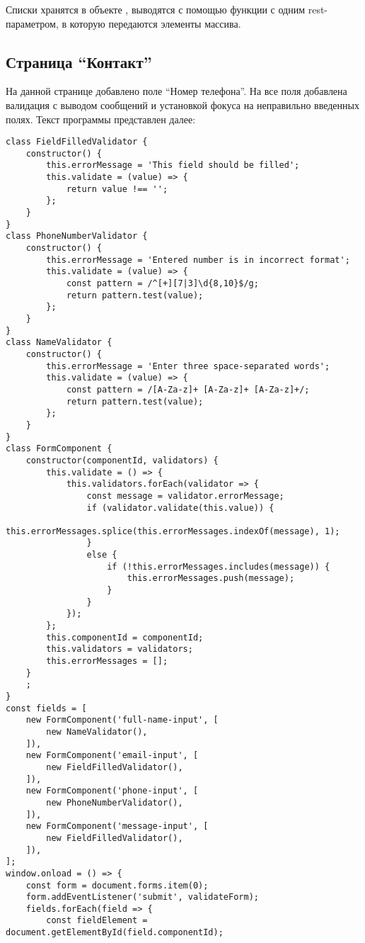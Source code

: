 \documentclass[a4paper,14pt]{extarticle}
\begin{document}
Списки хранятся в объекте , выводятся с помощью
функции с одним rest-параметром, в которую передаются элементы массива.

\subsection{Страница \enquote{Контакт}}
На данной странице добавлено поле \enquote{Номер телефона}. На все поля
добавлена валидация с выводом сообщений и установкой фокуса на
неправильно введенных полях. Текст программы представлен далее:
\begin{lstlisting}
class FieldFilledValidator {
    constructor() {
        this.errorMessage = 'This field should be filled';
        this.validate = (value) => {
            return value !== '';
        };
    }
}
class PhoneNumberValidator {
    constructor() {
        this.errorMessage = 'Entered number is in incorrect format';
        this.validate = (value) => {
            const pattern = /^[+][7|3]\d{8,10}$/g;
            return pattern.test(value);
        };
    }
}
class NameValidator {
    constructor() {
        this.errorMessage = 'Enter three space-separated words';
        this.validate = (value) => {
            const pattern = /[A-Za-z]+ [A-Za-z]+ [A-Za-z]+/;
            return pattern.test(value);
        };
    }
}
class FormComponent {
    constructor(componentId, validators) {
        this.validate = () => {
            this.validators.forEach(validator => {
                const message = validator.errorMessage;
                if (validator.validate(this.value)) {
                    this.errorMessages.splice(this.errorMessages.indexOf(message), 1);
                }
                else {
                    if (!this.errorMessages.includes(message)) {
                        this.errorMessages.push(message);
                    }
                }
            });
        };
        this.componentId = componentId;
        this.validators = validators;
        this.errorMessages = [];
    }
    ;
}
const fields = [
    new FormComponent('full-name-input', [
        new NameValidator(),
    ]),
    new FormComponent('email-input', [
        new FieldFilledValidator(),
    ]),
    new FormComponent('phone-input', [
        new PhoneNumberValidator(),
    ]),
    new FormComponent('message-input', [
        new FieldFilledValidator(),
    ]),
];
window.onload = () => {
    const form = document.forms.item(0);
    form.addEventListener('submit', validateForm);
    fields.forEach(field => {
        const fieldElement = document.getElementById(field.componentId);

\end{lstlisting}
\end{document}
